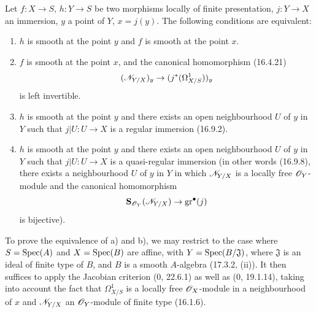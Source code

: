 \begin{theorem}[17.12.1]
\label{IV.17.12.1}
Let $f:X\to S$, $h:Y\to S$ be two morphisms locally of finite presentation, $j:Y\to X$ an immersion, $y$ a point of $Y$, $x=j(y)$. The following conditions are equivalent:
\begin{enumerate}
  \item[a)] $h$ is smooth at the point $y$ and $f$ is smooth at the point $x$.
  \item[b)] $f$ is smooth at the point $x$, and the canonical homomorphism (16.4.21)
  \[
  (\mathscr{N}_{Y/X})_y\to(j^*(\Omega^1_{X/S}))_y
  \]
  is left invertible.
  \item[c)] $h$ is smooth at the point $y$ and there exists an open neighbourhood $U$ of $y$ in $Y$ such that $j|U:U\to X$ is a regular immersion (16.9.2).


  \item[c')] $h$ is smooth at the point $y$ and there exists an open neighbourhood $U$ of $y$ in $Y$ such that $j|U:U\to X$ is a quasi-regular immersion (in other words (16.9.8), there exists a neighbourhood $U$ of $y$ in $Y$ in which $\mathscr{N}_{Y/X}$ is a locally free $\mathscr{O}_Y$-module and the canonical homomorphism
  \[
  \mathbf{S}_{\mathscr{O}_Y}(\mathscr{N}_{Y/X})\to\operatorname{gr}^{\bullet}(j)
  \]
  is bijective).
\end{enumerate}
\end{theorem}

To prove the equivalence of a) and b), we may restrict to the case where $S=\operatorname{Spec}(A)$ and $X=\operatorname{Spec}(B)$ are affine, with $Y=\operatorname{Spec}(B/\mathfrak J)$, where $\mathfrak J$ is an ideal of finite type of $B$, and $B$ is a smooth $A$-algebra (17.3.2, (ii)). It then suffices to apply the Jacobian criterion (0, 22.6.1) as well as (0, 19.1.14), taking into account the fact that $\Omega^1_{X/S}$ is a locally free $\mathscr{O}_X$-module in a neighbourhood of $x$ and $\mathscr{N}_{Y/X}$ an $\mathscr{O}_Y$-module of finite type (16.1.6).


